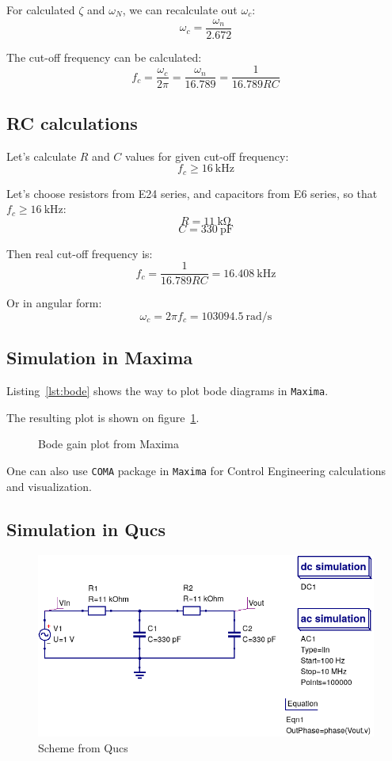 \documentclass[12pt, a4paper]{article}
\newcommand{\appname}[1]{\texttt{#1}}
\begin{document}
For calculated $\zeta$ and $\omega_N$, we can recalculate out $\omega_c$:
\[ \omega_c = \frac{\omega_n}{2.672} \]

The cut-off frequency can be calculated:
\[ f_c = \frac{\omega_c}{2 \pi} = \frac{\omega_n}{16.789}
       = \frac{1}{16.789 R C} \]

\subsection{RC calculations}

Let's calculate $R$ and $C$ values for given cut-off frequency:
\[ f_c \geqslant \SI{16}{\kilo\hertz} \]

Let's choose resistors from E24 series, and capacitors from E6 series, so
that $f_c \geqslant \SI{16}{\kilo\hertz}$:
\[ R = \SI{11}{\kilo\ohm} \]
\[ C = \SI{330}{\pico\farad} \]

Then real cut-off frequency is:
\[ f_c = \frac{1}{16.789 R C} = \SI{16.408}{\kilo\hertz} \]

Or in angular form:
\[ \omega_c = 2 \pi f_c = \SI{103094.5}{\radian\per\second} \]

\subsection{Simulation in Maxima}

Listing~\ref{lst:bode} shows the way to plot bode diagrams in \appname{Maxima}.



The resulting plot is shown on figure~\ref{fig:bode}.

\begin{figure}[h!]
\centering

\caption{Bode gain plot from Maxima}
\label{fig:bode}
\end{figure}

One can also use \appname{COMA} package in \appname{Maxima} for Control
Engineering calculations and visualization.

\subsection{Simulation in Qucs}

\begin{figure}[h!]
\centering
\includegraphics[width = 400pt]{images/qucs-scheme.png}
\caption{Scheme from Qucs}
\label{fig:qucs_scheme}
\end{figure}
\end{document}
